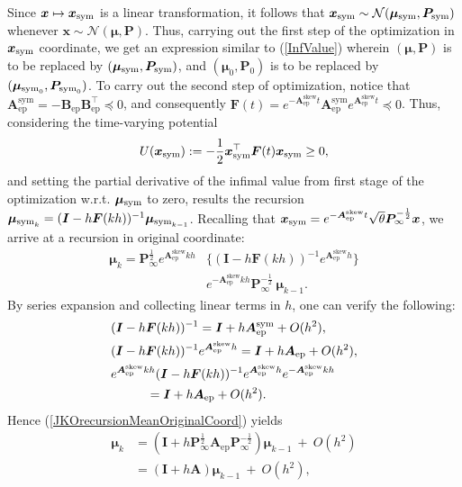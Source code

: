 \documentclass[letterpaper,10pt,twocolumn,conference]{ieeeconf}
\newcommand{\bbx}{{\bm{x}}}
\newcommand{\sym}{^{\mathrm{sym}}}
\newcommand{\skewsym}{^{\mathrm{skew}}}
\newcommand{\ep}{_{\mathrm{ep}}}
\newcommand{\bbmu}{\bm{\mu}}
\newcommand{\bbP}{\bm{P}}
\newcommand{\bbA}{\bm{A}}
\newcommand{\bbB}{\bm{B}}
\newcommand{\bbI}{\bm{I}}
\newcommand{\bbF}{\bm{F}}
\begin{document}
Since $\bbx \mapsto \bbx_{\rm{sym}}$ is a linear transformation, it follows that $\bbx_{\rm{sym}} \sim \mathcal{N}(\bbmu_{\rm{sym}}, \bbP_{\rm{sym}})$ whenever $\bbx\sim \mathcal{N}(\bbmu, \bbP)$. Thus, carrying out the first step of the optimization in $\bbx_{\rm{sym}}$ coordinate, we get an expression similar to (\ref{InfValue}) wherein $(\bbmu,\bbP)$ is to be replaced by $(\bbmu_{\rm{sym}},\bbP_{\rm{sym}})$, and $(\bbmu_{0},\bbP_{0})$ is to be replaced by $(\bbmu_{{\rm{sym}}_{0}},\bbP_{{\rm{sym}}_{0}})$. To carry out the second step of optimization, notice that $\bbA\ep\sym = -\bbB\ep\bbB\ep^{\top} \preceq 0$, and consequently $\bbF(t) = e^{-\bbA\ep\skewsym t} \bbA\ep\sym e^{\bbA\ep\skewsym t} \preceq 0$. Thus, considering the time-varying potential 
\[
U(\bbx_{\rm{sym}}) := -\frac{1}{2}\bbx_{\rm{sym}}^{\top}\bbF(t)\bbx_{\rm{sym}} \geq 0,
\]
and setting the partial derivative of the infimal value from first stage of the optimization w.r.t. $\bbmu_{\rm{sym}}$ to zero, results the recursion $\bbmu_{{\rm{sym}}_{k}} = (\bbI - h\bbF(kh))^{-1} \bbmu_{{\rm{sym}}_{k-1}}$. Recalling that $\bbx_{\rm{sym}} = e^{-\bbA\ep\skewsym t} \sqrt{\theta} \bbP_{\infty}^{-\frac{1}{2}} \bbx$, we arrive at a recursion in original coordinate:
\begin{align}
\bbmu_{k} = \bbP_{\infty}^{\frac{1}{2}} e^{\bbA\ep\skewsym kh} &\{(\bbI - h\bbF(kh))^{-1} e^{\bbA\ep\skewsym h}\} \nonumber\\
&e^{-\bbA\ep\skewsym kh} \bbP_{\infty}^{-\frac{1}{2}} \: \bbmu_{k-1}.
\label{JKOrecursionMeanOriginalCoord}	
\end{align}
By series expansion and collecting linear terms in $h$, one can verify the following: 
\begin{align*}
&(\bbI - h\bbF(kh))^{-1} = \bbI + h\bbA\ep\sym + O(h^{2}),\\
&(\bbI - h\bbF(kh))^{-1} e^{\bbA\ep\skewsym h} = \bbI + h\bbA\ep + O(h^{2}),\\
&e^{\bbA\ep\skewsym kh} (\bbI - h\bbF(kh))^{-1} e^{\bbA\ep\skewsym h} e^{-\bbA\ep\skewsym kh}\\
&\hspace*{1cm}= \bbI + h\bbA\ep + O(h^{2}).
\end{align*}
Hence (\ref{JKOrecursionMeanOriginalCoord}) yields
\begin{align}
\bbmu_{k} &= \left(\bbI + h\bbP_{\infty}^{\frac{1}{2}}\bbA\ep\bbP_{\infty}^{-\frac{1}{2}}\right) \bbmu_{k-1} \: + \: O(h^{2}) \nonumber\\
&= \left(\bbI + h\bbA\right) \bbmu_{k-1} \: + \: O(h^{2}),
\label{JKOmeanrecoveryGeneralcase}
\end{align}
\end{document}
